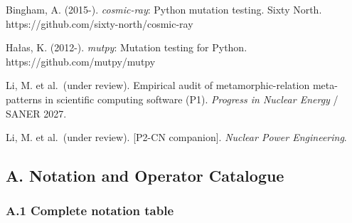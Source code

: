 \documentclass[review,12pt,authoryear]{elsarticle}
\begin{document}
Bingham, A. (2015-). \emph{cosmic-ray}: Python mutation testing. Sixty
North. https://github.com/sixty-north/cosmic-ray

Hałas, K. (2012-). \emph{mutpy}: Mutation testing for Python.
https://github.com/mutpy/mutpy

Li, M. et al.~(under review). Empirical audit of metamorphic-relation
meta-patterns in scientific computing software (P1). \emph{Progress in
Nuclear Energy} / SANER 2027.

Li, M. et al.~(under review). {[}P2-CN companion{]}. \emph{Nuclear Power
Engineering}.

\appendix

\subsection{A. Notation and Operator
Catalogue}\label{a.-notation-and-operator-catalogue}

\subsubsection{A.1 Complete notation
table}\label{a.1-complete-notation-table}
\end{document}
